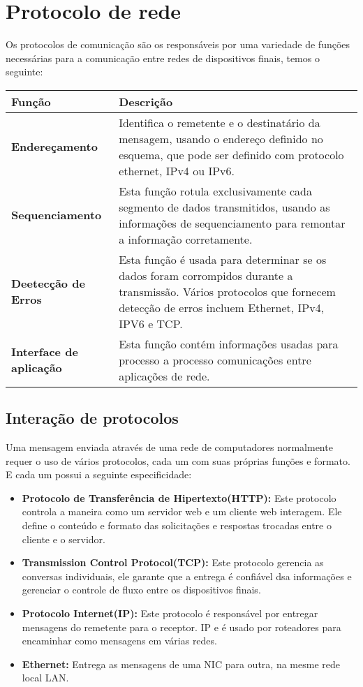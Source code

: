 \documentclass[12pt a4paper]{paper}
\begin{document}
\section{Protocolo de rede} %
\label{sec:Protocolo de rede}
Os protocolos de comunicação são os responsáveis por uma variedade de funções 
necessárias para a comunicação entre redes de dispositivos finais, temos o seguinte: 

\begin{center}
  \begin{tabular}{ | m{3cm} | m{7cm} |}
\hline
\textbf{Função} & \textbf{Descrição} \\
\hline
\textbf{Endereçamento} & Identifica  o remetente e o destinatário da mensagem, usando o endereço definido no esquema, que pode ser definido com protocolo ethernet, IPv4 ou IPv6.\\
\hline 
\textbf{Sequenciamento} & Esta função rotula exclusivamente cada segmento de dados transmitidos, usando as informações de sequenciamento para remontar a informação corretamente.\\
\hline
\textbf{Deetecção de Erros } & Esta função é usada para determinar se os dados foram corrompidos durante a transmissão. Vários protocolos que fornecem detecção de erros incluem Ethernet, IPv4, IPV6 e TCP.\\
\hline
\textbf{Interface de aplicação} & Esta função contém informações usadas para processo a processo comunicações entre aplicações de rede.\\
\hline
\end{tabular}
\end{center}

\subsection{Interação de protocolos} %
\label{sub:Interação de protocolos}
Uma mensagem enviada através de uma rede de computadores normalmente requer o uso de 
vários protocolos, cada um com suas próprias funções e formato. E cada um possui 
a seguinte especificidade:

\begin{itemize}
  \item \textbf{Protocolo de Transferência de Hipertexto(HTTP): }Este protocolo controla a maneira como um servidor web e um cliente web interagem. Ele define o conteúdo e formato das solicitações e respostas trocadas entre o cliente e o servidor.  
  \item \textbf{Transmission Control Protocol(TCP): } Este protocolo gerencia as conversas individuais, ele garante que a entrega é confiável dsa informações e gerenciar o controle de fluxo entre os dispositivos finais. 
  \item \textbf{Protocolo Internet(IP): } Este protocolo é responsável por entregar mensagens do remetente para o receptor. IP e é usado por roteadores para encaminhar como mensagens em várias redes.
  \item \textbf{Ethernet: }Entrega as mensagens de uma NIC para outra, na mesme rede local LAN.
\end{itemize}
\end{document}
